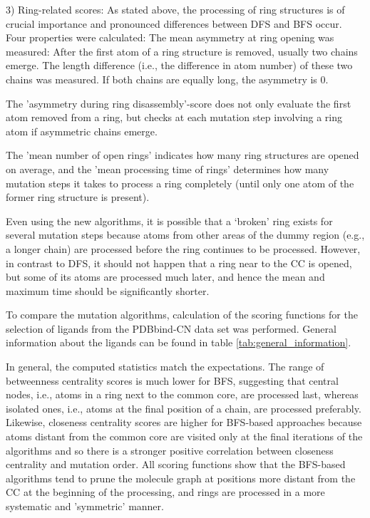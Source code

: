 3) Ring-related scores: As stated above, the processing of ring structures
is of crucial importance and pronounced differences between DFS and
BFS occur. Four properties were calculated: The mean asymmetry at
ring opening was measured: After the first atom of a ring structure
is removed, usually two chains emerge. The length difference (i.e.,
the difference in atom number) of these two chains was measured. If
both chains are equally long, the asymmetry is 0. 

The 'asymmetry during ring disassembly'-score does not only evaluate
the first atom removed from a ring, but checks at each mutation step
involving a ring atom if asymmetric chains emerge.

The 'mean number of open rings' indicates how many ring structures
are opened on average, and the 'mean processing time of rings' determines
how many mutation steps it takes to process a ring completely (until
only one atom of the former ring structure is present).

Even using the new algorithms, it is possible 
that a \textquoteleft broken\textquoteright{} ring exists for several mutation steps
 because atoms from other areas of the dummy region (e.g.,
a longer chain) are processed before the ring continues to be processed. However, in contrast to DFS,
it should not happen that a ring near to the CC is opened, but some of its atoms are processed much later, and hence the mean and maximum time should be significantly shorter. 

To compare the mutation algorithms, calculation of the scoring functions for the selection of ligands from the PDBbind-CN data set was performed. General information about the ligands can be found in table \ref{tab:general_information}. 

In general, the computed statistics match the expectations. The range of betweenness centrality scores is much lower for BFS, suggesting that central nodes, i.e., atoms in a ring next to the common core, are processed last, whereas isolated ones, i.e., atoms at the final position of a chain, are processed preferably.
Likewise, closeness centrality scores are higher for BFS-based approaches because atoms distant from the common core are visited only at the final iterations of the algorithms and so there is a stronger positive correlation between closeness centrality and  mutation order. 
All scoring functions show that the BFS-based algorithms tend to prune the molecule graph at positions more distant from the CC at the beginning of the processing, and rings are processed in a more systematic and 'symmetric' manner.

